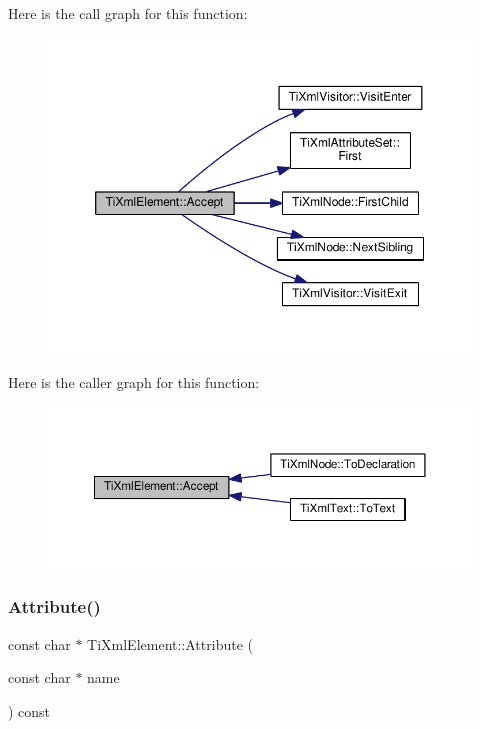 Here is the call graph for this function\+:
\nopagebreak
\begin{figure}[H]
\begin{center}
\leavevmode
\includegraphics[width=350pt]{class_ti_xml_element_a01d33358cce9d1817b557d314dda3779_cgraph}
\end{center}
\end{figure}
Here is the caller graph for this function\+:
\nopagebreak
\begin{figure}[H]
\begin{center}
\leavevmode
\includegraphics[width=350pt]{class_ti_xml_element_a01d33358cce9d1817b557d314dda3779_icgraph}
\end{center}
\end{figure}
\mbox{\label{class_ti_xml_element_a6042f518748f475a7ac4b4e0b509eb05}} 
\subsubsection{\texorpdfstring{Attribute()}{Attribute()}\hspace{0.1cm}{\footnotesize\ttfamily [1/3]}}
{\footnotesize\ttfamily const char $\ast$ Ti\+Xml\+Element\+::\+Attribute (\begin{DoxyParamCaption}\item[{const char $\ast$}]{name }\end{DoxyParamCaption}) const}

